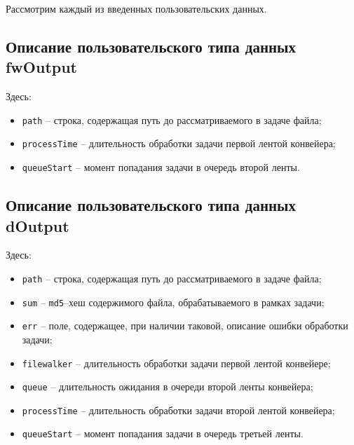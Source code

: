 Рассмотрим каждый из введенных пользовательских данных.
\clearpage

\captionsetup{justification = raggedright, singlelinecheck = false}

\subsection{Описание пользовательского типа данных fwOutput}


Здесь:
\begin{itemize}
    \item \texttt{path} -- строка, содержащая путь до рассматриваемого в задаче файла;
    \item \texttt{processTime} -- длительность обработки задачи первой лентой конвейера;
    \item \texttt{queueStart} -- момент попадания задачи в очередь второй ленты.
\end{itemize}

\subsection{Описание пользовательского типа данных dOutput}


Здесь:
\begin{itemize}
    \item \texttt{path} -- строка, содержащая путь до рассматриваемого в задаче файла;
    \item \texttt{sum} -- \texttt{md5}--хеш содержимого файла, обрабатываемого в рамках задачи;
    \item \texttt{err} -- поле, содержащее, при наличии таковой, описание ошибки обработки задачи;
    \item \texttt{filewalker} --  длительность обработки задачи первой лентой конвейере;
    \item \texttt{queue} -- длительность ожидания в очереди второй ленты конвейера;
    \item \texttt{processTime} -- длительность обработки задачи второй лентой конвейера;
    \item \texttt{queueStart} -- момент попадания задачи в очередь третьей ленты.
\end{itemize}

